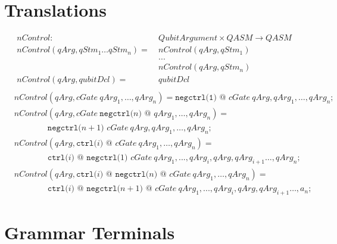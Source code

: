 \begin{appendices}
\chapter{Translations}
\label{appendix:translation}

\begin{align*}
    nControl : \ & QubitArgument \times QASM \to QASM\\
    nControl(qArg, qStm_1 \dots qStm_n) = \ & nControl(qArg, qStm_1)\\
        & ...\\
        & nControl(qArg, qStm_n)\\
    nControl(qArg, qubitDcl) = \ & qubitDcl\\
\end{align*}
\begin{align*}
    &nControl(qArg, cGate \ qArg_1, \dots, qArg_n ) =  \texttt{negctrl(1) @ } cGate \ qArg, qArg_1, \dots, qArg_n\texttt{;}\\
    &nControl(qArg, cGate \ \texttt{negctrl(}n\texttt{) @ } qArg_1, \dots, qArg_n ) = \\
    & \quad \quad \quad \quad \texttt{negctrl(}n + 1\texttt{) }cGate \ qArg, qArg_1, \dots, qArg_n\texttt{;}\\
    &nControl(qArg, \texttt{ctrl(}i \texttt{) @ } cGate \ qArg_1, \dots, qArg_n ) = \\
    & \quad \quad \quad \quad \texttt{ctrl(}i \texttt{) @ } \texttt{negctrl(}1\texttt{) } cGate \ qArg_1, ..., qArg_i, qArg, qArg_{i+1} \dots, qArg_n\texttt{;}\\
    &nControl(qArg, \texttt{ctrl(}i \texttt{) @ } \texttt{negctrl(}n\texttt{) @ } cGate \ qArg_1, \dots, qArg_n ) = \\
    & \quad \quad \quad \quad \texttt{ctrl(}i \texttt{) @ } \texttt{negctrl(}n + 1\texttt{) @ } cGate \ qArg_1, ..., qArg_i, qArg, qArg_{i+1} \dots, a_n\texttt{;}
\end{align*}

\chapter{Grammar Terminals}
\label{appendix:grammar_terminals}

\end{appendices}